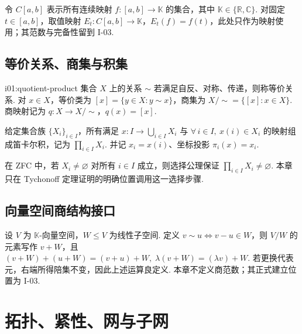 \begin{FAExample}[连续函数集的集合论接口]
令 \(\displaystyle C[a,b]\) 表示所有连续映射 \(\displaystyle f:[a,b]\to\mathbb K\) 的集合，其中 \(\displaystyle \mathbb K\in\{\mathbb R,\mathbb C\}\). 对固定 \(\displaystyle t\in[a,b]\)，取值映射 \(\displaystyle E_t:C[a,b]\to\mathbb K\)，\(\displaystyle E_t(f)=f(t)\)，此处只作为映射使用；其范数与完备性留到 I-03.
\end{FAExample}

\subsection{等价关系、商集与积集}

\begin{FADefinition}[C][商集与积集]{i01:quotient-product}
集合 \(\displaystyle X\) 上的关系 \(\displaystyle \sim\) 若满足自反、对称、传递，则称等价关系. 对 \(\displaystyle x\in X\)，等价类为 \(\displaystyle [x]=\{y\in X:y\sim x\}\)，商集为 \(\displaystyle X/{\sim}=\{[x]:x\in X\}\). 商映射记为 \(\displaystyle q:X\to X/{\sim}\)，\(\displaystyle q(x)=[x]\).

给定集合族 \(\displaystyle \{X_i\}_{i\in I}\)，所有满足 \(\displaystyle x:I\to\bigcup_{i\in I}X_i\) 与 \(\displaystyle \forall\,i\in I,\ x(i)\in X_i\) 的映射组成笛卡尔积，记为 \(\displaystyle \prod_{i\in I}X_i\). 并记 \(\displaystyle x_i=x(i)\)、坐标投影 \(\displaystyle \pi_i(x)=x_i\).
\end{FADefinition}

在 ZFC 中，若 \(\displaystyle X_i\neq\varnothing\) 对所有 \(\displaystyle i\in I\) 成立，则选择公理保证 \(\displaystyle \prod_{i\in I}X_i\neq\varnothing\). 本章只在 Tychonoff 定理证明的明确位置调用这一选择步骤.

\subsection{向量空间商结构接口}

设 \(\displaystyle V\) 为 \(\displaystyle \mathbb K\)-向量空间，\(\displaystyle W\leqslant V\) 为线性子空间. 定义 \(\displaystyle v\sim u\iff v-u\in W\)，则 \(\displaystyle V/W\) 的元素写作 \(\displaystyle v+W\)，且 \(\displaystyle (v+W)+(u+W)=(v+u)+W, \; \lambda(v+W)=(\lambda v)+W\).
若更换代表元，右端所得陪集不变，因此上述运算良定义. 本章不定义商范数；其正式建立位置为 I-03.

\section{拓扑、紧性、网与子网}\label{sec:i01-topology}

